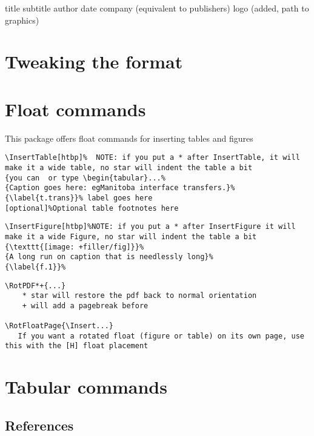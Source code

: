 \documentclass[compact]{corpboreport}
\begin{document}
title
subtitle
author
date
company (equivalent to publishers)
logo (added, path to graphics)

\section{Tweaking the format}

\section{Float commands}

This package offers float commands for inserting tables and figures

\lstset{language=tex}
\begin{lstlisting}
\InsertTable[htbp]%  NOTE: if you put a * after InsertTable, it will make it a wide table, no star will indent the table a bit
{you can  or type \begin{tabular}...%
{Caption goes here: egManitoba interface transfers.}%
{\label{t.trans}}% label goes here
[optional]%Optional table footnotes here
\end{lstlisting}


\lstset{language=tex}
\begin{lstlisting}
\InsertFigure[htbp]%NOTE: if you put a * after InsertFigure it will make it a wide Figure, no star will indent the table a bit
{\texttt{[image: +filler/fig]}}%
{A long run on caption that is needlessly long}%
{\label{f.1}}%
\end{lstlisting}



\lstset{language=tex}
\begin{lstlisting}
\RotPDF*+{...}
	* star will restore the pdf back to normal orientation
	+ will add a pagebreak before

\RotFloatPage{\Insert...}
   If you want a rotated float (figure or table) on its own page, use this with the [H] float placement
\end{lstlisting}



\section{Tabular commands}

\subsection{References}
\end{document}

